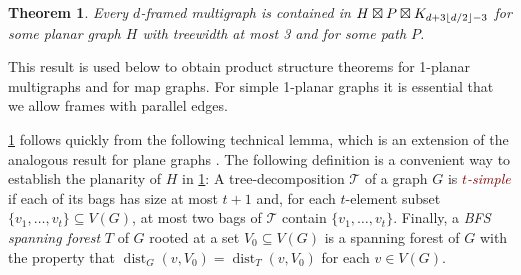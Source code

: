 \documentclass{patmorin}
\theoremstyle{plain}
\newtheorem{thm}{Theorem}
\theoremstyle{definition}
\newcommand{\defin}[1]{\textcolor{Maroon}{\emph{#1}}}
\DeclareMathOperator{\dist}{dist}
\DeclarePairedDelimiter{\floor}{\lfloor}{\rfloor}
\begin{document}
\begin{thm}\label{d_framed_product_stucture}
Every $d$-framed multigraph is contained in $H\boxtimes P\boxtimes K_{d+3\floor{d/2}-3}$ for some planar graph $H$ with treewidth at most 3 and for some path $P$.
\end{thm}

This result is used below to obtain product structure theorems for 1-planar multigraphs and for map graphs. For simple 1-planar graphs it is essential that we allow frames with parallel edges.

\cref{d_framed_product_stucture} follows quickly from the following technical lemma, which is an extension of the analogous result for plane graphs \cite{DJMMUW20}. The following definition is a convenient way to establish the planarity of $H$ in \cref{d_framed_product_stucture}:  A tree-decomposition $\mathcal{T}$ of a graph $G$ is \defin{$t$-simple} if each of its bags has size at most $t+1$ and, for each $t$-element subset $\{v_1,\ldots,v_t\}\subseteq V(G)$, at most two bags of $\mathcal{T}$ contain $\{v_1,\ldots,v_t\}$.  Finally, a \emph{BFS spanning forest} $T$ of $G$ rooted at a set $V_0\subseteq V(G)$ is a spanning forest of $G$ with the property that $\dist_G(v,V_0)=\dist_T(v,V_0)$ for each $v\in V(G)$.
\end{document}
